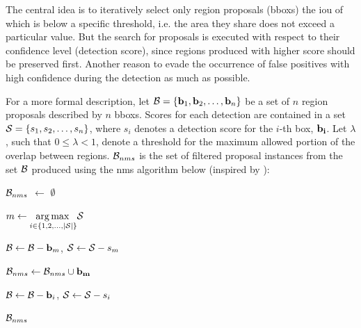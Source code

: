 The central idea is to iteratively select only region proposals (\glspl{bbox}) the \gls{iou} of which is below a specific threshold, i.e. the area they share does not exceed a particular value. But the search for proposals is executed with respect to their confidence level (detection score), since regions produced with higher score should be preserved first. Another reason to evade the occurrence of false positives with high confidence during the detection as much as possible.

For a more formal description, let $\mathcal{B} = \left\{ {\mathbf{b}_1, \mathbf{b}_2, \dots, \mathbf{b}_n} \right\}$ be a set of $n$ region proposals described by $n$ \glspl{bbox}. Scores for each detection are contained in a set $\mathcal{S} = \left\{ {s_1, s_2, \dots, s_n} \right\}$, where $s_i$ denotes a detection score for the $i$-th box, $\mathbf{b_i}$. Let $\lambda$, such that $0 \leq \lambda < 1$, denote a threshold for the maximum allowed portion of the overlap between regions. $\mathcal{B}_{nms}$ is the set of filtered proposal instances from the set $\mathcal{B}$ produced using the \gls{nms} algorithm below (inspired by \cite{Bodla2017}):

\begin{algorithmic}[1]
    
        \State $\mathcal{B}_{nms}$ $\gets$ $\emptyset$
        
            
            \State $m \gets \underset{i \in \left\{ {1, 2, \dots, \left\vert \mathcal{S} \right\vert} \right\}}{\operatorname*{arg\,max}{}} \mathcal{S}$
            
            \State $\mathcal{B} \gets \mathcal{B} - \mathbf{b}_m$, $\mathcal{S} \gets \mathcal{S} - s_m$
            
            \State $\mathcal{B}_{nms} \gets \mathcal{B}_{nms} \cup \mathbf{b_m}$
            
            
                
                    \State $\mathcal{B} \gets \mathcal{B} - \mathbf{b}_i$, $\mathcal{S} \gets \mathcal{S} - s_i$
                \EndIf
            \EndFor
        \EndWhile
        
        \State \Return $\mathcal{B}_{nms}$
    \EndFunction
\end{algorithmic}

